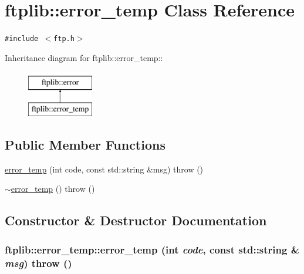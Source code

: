 \hypertarget{classftplib_1_1error__temp}{
\section{ftplib::error\_\-temp Class Reference}
\label{classftplib_1_1error__temp}
}
{\tt \#include $<$ftp.h$>$}

Inheritance diagram for ftplib::error\_\-temp::\begin{figure}[H]
\begin{center}
\leavevmode
\includegraphics[height=2cm]{classftplib_1_1error__temp}
\end{center}
\end{figure}
\subsection*{Public Member Functions}
\begin{CompactItemize}
\item 
\hyperlink{classftplib_1_1error__temp_6c8a81fc949ee5591a85d5efeb492ea2}{error\_\-temp} (int code, const std::string \&msg)  throw ()
\item 
\hyperlink{classftplib_1_1error__temp_eb3e3828117a6c872688e9ec508e9b68}{$\sim$error\_\-temp} ()  throw ()
\end{CompactItemize}


\subsection{Constructor \& Destructor Documentation}
\hypertarget{classftplib_1_1error__temp_6c8a81fc949ee5591a85d5efeb492ea2}{
\subsubsection[{error\_\-temp}]{\setlength{\rightskip}{0pt plus 5cm}ftplib::error\_\-temp::error\_\-temp (int {\em code}, \/  const std::string \& {\em msg})  throw ()}}
\label{classftplib_1_1error__temp_6c8a81fc949ee5591a85d5efeb492ea2}



